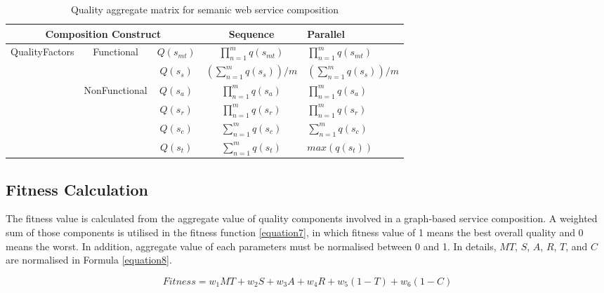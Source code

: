 \documentclass{llncs}
\begin{document}
\begin{table}[]
\centering
\caption{Quality aggregate matrix for semanic web service composition}
\label{table1}
\begin{tabular}{|c|c|c|c|l|}
\hline
\multicolumn{3}{|c|}{Composition Construct}                                      & Sequence                             & Parallel \\ \hline
\multirow{5}{*}{QualityFactors} & \multirow{2}{*}{Functional}    & $Q(s_ {mt})$  &$\prod_{n=1}^{m} q(s_ {mt})$          &  $\prod_{n=1}^{m} q(s_ {mt})$ \\ \cline{3-5}
                                &                                & $Q(s_ {s})$  & $(\sum_{n=1}^m q(s_ {s}))/m$        &  $(\sum_{n=1}^m q(s_ {s}))/m$  \\ \cline{2-5}   
                                & \multirow{4}{*}{NonFunctional} & $Q(s_{a})$    & $\prod_{n=1}^{m} q(s_a)$             &  $\prod_{n=1}^{m} q(s_a)$ \\ \cline{3-5} 
                                &                                & $Q(s_{r})$    & $\prod_{n=1}^{m} q(s_r)$             &  $\prod_{n=1}^{m} q(s_r)$ \\ \cline{3-5} 
                                &                                & $Q(s_{c})$    & $\sum_{n=1}^m q(s_ {c})$             &  $\sum_{n=1}^m q(s_ {c})$ \\ \cline{3-5} 
                                &                                & $Q(s_{t})$    & $\sum_{n=1}^m q(s_ {t})$             &  $max(q(s_ {t}))$ \\ \hline
\end{tabular}
\end{table}

\subsection{Fitness Calculation}
The fitness value is calculated from the aggregate value of quality components involved in a graph-based service composition. A weighted sum of those components is utilised in the fitness function \ref{equation7}, in which fitness value of 1 means the best overall quality and 0 means the worst. In addition, aggregate value of each parameters must be normalised between 0 and 1. In details, $MT$, $S$, $A$, $R$, $T$, and $C$ are normalised in Formula \ref{equation8}.


\begin{equation}
\label{equation7}
Fitness = w_1MT + w_2S + w_3A + w_4R + w_5(1 - T) + w_6(1 - C)
\end{equation}
\end{document}
